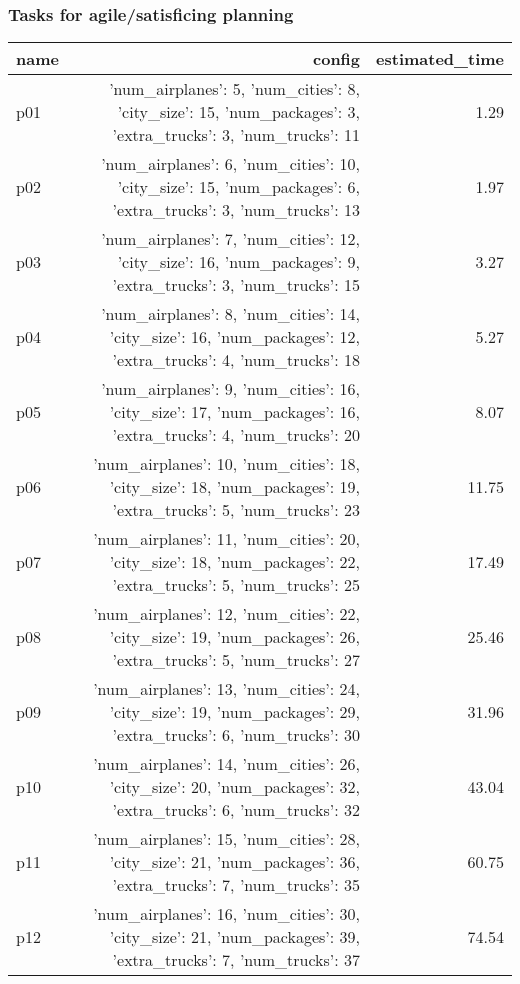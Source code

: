\documentclass{article}
\begin{document}
                                \subsubsection*{Tasks for agile/satisficing planning}
                                
                            \begin{center}
                            \scriptsize
                            \begin{tabular}{@{}l|r|r@{}}
                            name & config & estimated\_time\\\midrule
                              p01&{'num\_airplanes': 5, 'num\_cities': 8, 'city\_size': 15, 'num\_packages': 3, 'extra\_trucks': 3, 'num\_trucks': 11}&1.29\\
  p02&{'num\_airplanes': 6, 'num\_cities': 10, 'city\_size': 15, 'num\_packages': 6, 'extra\_trucks': 3, 'num\_trucks': 13}&1.97\\
  p03&{'num\_airplanes': 7, 'num\_cities': 12, 'city\_size': 16, 'num\_packages': 9, 'extra\_trucks': 3, 'num\_trucks': 15}&3.27\\
  p04&{'num\_airplanes': 8, 'num\_cities': 14, 'city\_size': 16, 'num\_packages': 12, 'extra\_trucks': 4, 'num\_trucks': 18}&5.27\\
  p05&{'num\_airplanes': 9, 'num\_cities': 16, 'city\_size': 17, 'num\_packages': 16, 'extra\_trucks': 4, 'num\_trucks': 20}&8.07\\
  p06&{'num\_airplanes': 10, 'num\_cities': 18, 'city\_size': 18, 'num\_packages': 19, 'extra\_trucks': 5, 'num\_trucks': 23}&11.75\\
  p07&{'num\_airplanes': 11, 'num\_cities': 20, 'city\_size': 18, 'num\_packages': 22, 'extra\_trucks': 5, 'num\_trucks': 25}&17.49\\
  p08&{'num\_airplanes': 12, 'num\_cities': 22, 'city\_size': 19, 'num\_packages': 26, 'extra\_trucks': 5, 'num\_trucks': 27}&25.46\\
  p09&{'num\_airplanes': 13, 'num\_cities': 24, 'city\_size': 19, 'num\_packages': 29, 'extra\_trucks': 6, 'num\_trucks': 30}&31.96\\
  p10&{'num\_airplanes': 14, 'num\_cities': 26, 'city\_size': 20, 'num\_packages': 32, 'extra\_trucks': 6, 'num\_trucks': 32}&43.04\\
  p11&{'num\_airplanes': 15, 'num\_cities': 28, 'city\_size': 21, 'num\_packages': 36, 'extra\_trucks': 7, 'num\_trucks': 35}&60.75\\
  p12&{'num\_airplanes': 16, 'num\_cities': 30, 'city\_size': 21, 'num\_packages': 39, 'extra\_trucks': 7, 'num\_trucks': 37}&74.54\\

\end{tabular}
\end{center}
\end{document}
